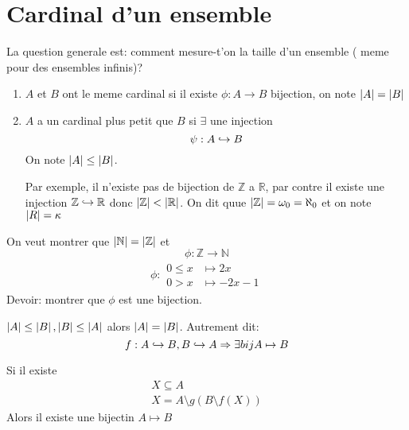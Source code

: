 \documentclass[../main.tex]{subfiles}
\begin{document}
\section{Cardinal d'un ensemble}
La question generale est: comment mesure-t'on la taille d'un ensemble ( meme pour des ensembles infinis)?\\
\begin{defn}\label{defn:cardinal_d_un_ensemble}
	\begin{enumerate}
		\item $A$ et  $B$ ont le meme cardinal si il existe $\phi: A \to B$ bijection, on note $\left\vert A\right\vert = \left\vert B\right\vert$\\
		\item $A$ a un cardinal plus petit que $B$ si $\exists$ une injection 
			\[ 
			\psi: A \hookrightarrow B
			\]
			On note $\left\vert A\right\vert \leq \left\vert B\right\vert$.

			Par exemple, il n'existe pas de bijection de $\mathbb{Z}$ a $\mathbb{R}$, par contre il existe une injection $\mathbb{Z} \hookrightarrow \mathbb{R}$ donc $\left\vert\mathbb{Z}\right\vert < \left\vert\mathbb{R}\right\vert$. On dit quue $\left\vert\mathbb{Z}\right\vert = \omega_0 = \aleph_0$ et on note $\left\vert R\right\vert= \kappa$
	\end{enumerate}
\end{defn}
\begin{exemple}
	On veut montrer que $\left\vert\mathbb{N}\right\vert = \left\vert\mathbb{Z}\right\vert$ et 
	\[ 
		\phi: \mathbb{Z} \to \mathbb{N}
	\]
	\begin{align*}
	\phi :
	\begin{aligned}
		0 \leq x &\mapsto 2x\\
	0>x &\mapsto -2x-1
	\end{aligned}
	\end{align*}
	Devoir: montrer que $\phi$ est une bijection.
\end{exemple}
\begin{thm}
	$\left\vert A\right\vert \leq \left\vert B\right\vert, \left\vert B\right\vert \leq \left\vert A\right\vert$ alors $\left\vert A\right\vert = \left\vert B\right\vert$.
	Autrement dit:
	\[ 
	f: A \hookrightarrow B, B \hookrightarrow A \Rightarrow \exists bij A \mapsto B
	\]
	
\end{thm}
\begin{lemma}
	
	Si il existe
	\begin{align*}
	X \subseteq A\\
	X = A \setminus g(B\setminus f(X))
	\end{align*}
	Alors il existe une bijectin $A \mapsto B$
\end{lemma}
\end{document}
